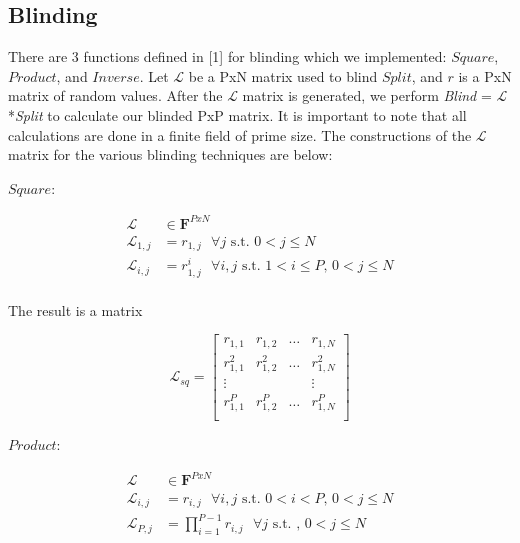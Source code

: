 \documentclass[conference]{IEEEtran}
\begin{document}
\subsection{Blinding} \label{ssec:blind}
There are 3 functions defined in [1] for blinding which we implemented: $Square$, $Product$, and $Inverse$. Let $\mathcal{L}$ be a PxN matrix used to blind $\textit{Split}$, and $\textit{r}$ is a PxN matrix of random values. After the $\mathcal{L}$ matrix is generated, we perform \textit{Blind} = $\mathcal{L}$*\textit{Split} to calculate our blinded PxP matrix. It is important to note that all calculations are done in a finite field of prime size. The constructions of the $\mathcal{L}$ matrix for the various blinding techniques are below:\\

\begin{flushleft}
$Square$:\\
\end{flushleft}
\begin{equation*}
\begin{split}
\mathcal{L} &\in \textbf{F}^{PxN}\\
\mathcal{L}_{1,j} &= \textit{r}_{1,j} \text{ } \forall j\text{ s.t. }0 < j \leq N\\
\mathcal{L}_{i,j} &= \textit{r}_{1,j}^i \text{ } \forall i, j \text{ s.t. } 1 < i \leq P\text{, }0 < j \leq N\\
\end{split}
\end{equation*}

\begin{flushleft}
The result is a matrix\\
\end{flushleft}

\begin{equation*}
\mathcal{L}_{sq} = 
\begin{bmatrix}
r_{1,1} & r_{1,2} & \dots & r_{1,N}\\
r_{1,1}^2 & r_{1,2}^2 & \dots & r_{1,N}^2 \\
\vdots &  &  & \vdots\\
r_{1,1}^P & r_{1,2}^P & \dots & r_{1,N}^P\\
\end{bmatrix}
\end{equation*}
\hfill\break

\begin{flushleft}
$Product$:\\
\end{flushleft}
\begin{equation*}
\begin{split}
\mathcal{L} &\in \textbf{F}^{PxN}\\
\mathcal{L}_{i,j} &= \textit{r}_{i,j} \text{ } \forall i, j \text{ s.t. } 0 < i < P \text{, } 0 < j \leq N\\
\mathcal{L}_{P,j} &= \prod_{i = 1}^{P - 1} r_{i,j} \text{ } \forall j \text{ s.t. }\text{, }0 < j \leq N\\
\end{split}
\end{equation*}
\end{document}
